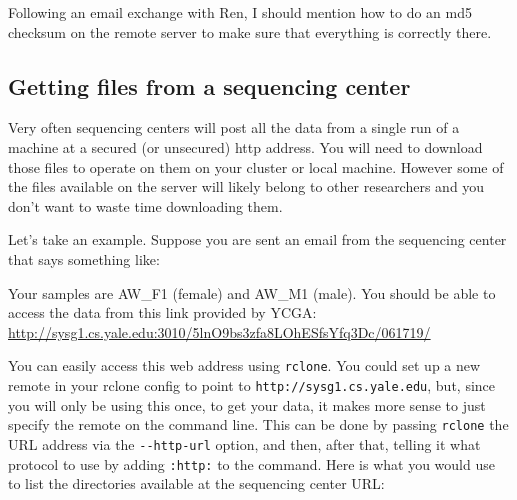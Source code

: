 \documentclass[]{krantz}
\makeatletter
\newenvironment{Shaded}{\begin{snugshade}}{\end{snugshade}}
\newcommand{\CommentTok}[1]{\textcolor[rgb]{0.37,0.37,0.37}{\textit{#1}}}
\newcommand{\ExtensionTok}[1]{#1}
\newcommand{\NormalTok}[1]{#1}
\renewenvironment{quote}{\begin{VF}}{\end{VF}}
\newenvironment{kframe}{%
\medskip{}
\setlength{\fboxsep}{.8em}
 \def\at@end@of@kframe{}%
 \ifinner\ifhmode%
  \def\at@end@of@kframe{\end{minipage}}%
  \begin{minipage}{\columnwidth}%
 \fi\fi%
 \def\FrameCommand##1{\hskip\@totalleftmargin \hskip-\fboxsep
 \colorbox{shadecolor}{##1}\hskip-\fboxsep
     \hskip-\linewidth \hskip-\@totalleftmargin \hskip\columnwidth}%
 \MakeFramed {\advance\hsize-\width
   \@totalleftmargin\z@ \linewidth\hsize
   \@setminipage}}%
 {\par\unskip\endMakeFramed%
 \at@end@of@kframe}
\renewenvironment{Shaded}{\begin{kframe}}{\end{kframe}}
\makeatother
\begin{document}
Following an email exchange with Ren, I should mention how to do an md5
checksum on the remote server to make sure that everything is correctly there.

\hypertarget{getting-files-from-a-sequencing-center}{%
\subsection{Getting files from a sequencing center}\label{getting-files-from-a-sequencing-center}}

Very often sequencing centers will post all the data from a single
run of a machine at a secured (or unsecured) http address. You will
need to download those files to operate on them on your cluster or
local machine. However some of the files available on the server
will likely belong to other researchers and you don't want to waste time
downloading them.

Let's take an example. Suppose you are sent an email from the sequencing
center that says something like:

\begin{quote}
Your samples are AW\_F1 (female) and AW\_M1 (male).
You should be able to access the data from this link provided by YCGA:
\url{http://sysg1.cs.yale.edu:3010/5lnO9bs3zfa8LOhESfsYfq3Dc/061719/}
\end{quote}

You can easily access this web address using \texttt{rclone}. You could set up a new
remote in your rclone config to point to \texttt{http://sysg1.cs.yale.edu},
but, since you will only be using this once, to get your data, it makes
more sense to just specify the remote on the command line. This can be
done by passing \texttt{rclone} the URL address via the \texttt{-\/-http-url} option, and
then, after that, telling it what protocol to use by adding \texttt{:http:} to
the command. Here is what you would use to list the directories available
at the sequencing center URL:

\begin{Shaded}
\end{Shaded}
\end{document}
